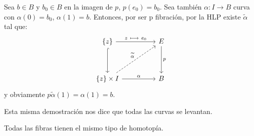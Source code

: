 \begin{demo}
Sea $b \in B$ y $b_0 \in B$ en la imagen de $p$, $p(e_0) = b_0$. Sea también $\alpha : I \longrightarrow B$ curva con $\alpha(0) = b_0$, $\alpha(1) = b$. Entonces, por ser p fibración, por la HLP existe $\widetilde{\alpha}$ tal que:
\[
\begin{tikzcd}
\{z\} \arrow{rr}{z \ \longmapsto \ e_0} \arrow[hook]{dd} & & E \arrow{dd}{p} \\
\\
\{z\} \times I \arrow{rr}{\alpha} \arrow[dashed]{uurr}{\widetilde{\alpha}} & & B
\end{tikzcd}
\]
y obviamente $p \widetilde{\alpha}(1) = \alpha(1) = b$.
\end{demo}
Esta misma demostración nos dice que todas las curvas se levantan.
\begin{teor}
Todas las fibras tienen el mismo tipo de homotopía.
\end{teor}
